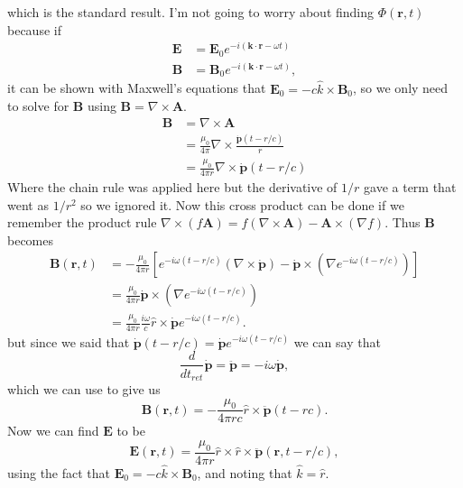 \documentclass[12pt]{article}
\newcommand{\br}{\mathbf{r}}
\begin{document}
which is the standard result. I'm not going to worry about finding $\Phi(\br,t)$ because if
\begin{align}
   \mathbf{E} &= \mathbf{E}_0e^{-i(\mathbf{k}\cdot\br - \omega t)} \\
   \mathbf{B} &= \mathbf{B}_0e^{-i(\mathbf{k}\cdot\br - \omega t)},
\end{align}
it can be shown with Maxwell's equations that $\mathbf{E}_0 = -c \hat{k}\times\mathbf{B}_0$, so we only need to solve for $\mathbf{B}$ using $\mathbf{B} = \nabla\times\mathbf{A}$.
\begin{align}
   \mathbf{B} &= \nabla\times\mathbf{A} \\
   &= \frac{\mu_0}{4\pi} \nabla\times\frac{\dot{\mathbf{p}}(t-r/c)}{r} \\
   &= \frac{\mu_0}{4\pi r} \nabla\times\dot{\mathbf{p}}(t-r/c)
\end{align}
Where the chain rule was applied here but the derivative of $1/r$ gave a term that went as $1/r^2$ so we ignored it. Now this cross product can be done if we remember the product rule $\nabla\times(f\mathbf{A}) = f(\nabla\times\mathbf{A}) - \mathbf{A}\times(\nabla f)$. Thus $\mathbf{B}$ becomes
\begin{align}
   \mathbf{B}(\br,t) &= -\frac{\mu_0}{4\pi r}\left[e^{-i\omega(t-r/c)}(\nabla\times\dot{\mathbf{p}}) - \dot{\mathbf{p}}\times(\nabla e^{-i\omega(t-r/c)}) \right] \\
   &= \frac{\mu_0}{4\pi r} \dot{\mathbf{p}}\times(\nabla e^{-i\omega(t-r/c)}) \\
   &= \frac{\mu_0}{4\pi r} \frac{i\omega}{c}\hat{r}\times\dot{\mathbf{p}}e^{-i\omega(t-r/c)}.
\end{align}
but since we said that $\dot{\mathbf{p}}(t-r/c) = \dot{\mathbf{p}}e^{-i\omega(t-r/c)}$ we can say that
\begin{equation}
   \frac{d}{dt_{ret}}\dot{\mathbf{p}} = \ddot{\mathbf{p}} = -i\omega\dot{\mathbf{p}},
\end{equation}
which we can use to give us
\begin{equation}
   \mathbf{B}(\br,t) = -\frac{\mu_0}{4\pi rc}\hat{r}\times\ddot{\mathbf{p}}(t-rc).
\end{equation}
Now we can find $\mathbf{E}$ to be
\begin{equation}
   \mathbf{E}(\br,t) = \frac{\mu_0}{4\pi r} \hat{r}\times\hat{r}\times\ddot{\mathbf{p}}(\br,t-r/c),
\end{equation}
using the fact that $\mathbf{E}_0 = -c \hat{k}\times\mathbf{B}_0$, and noting that $\hat{k}=\hat{r}$.
\end{document}
